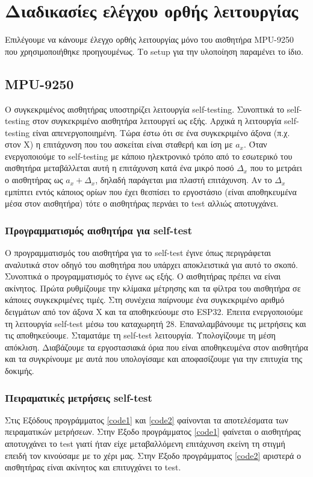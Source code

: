 \documentclass{article}
\begin{document}
\section{Διαδικασίες ελέγχου ορθής λειτουργίας}
Επιλέγουμε να κάνουμε έλεγχο ορθής λειτουργίας μόνο του αισθητήρα ΜPU-9250 που χρησιμοποιήθηκε προηγουμένως. Το setup για την υλοποίηση παραμένει το ίδιο.

\subsection{MPU-9250}
Ο συγκεκριμένος αισθητήρας υποστηρίζει λειτουργία self-testing. Συνοπτικά το self-testing στον συγκεκριμένο αισθητήρα λειτουργεί ως εξής. Αρχικά η λειτουργία self-testing είναι απενεργοποιημένη. Τώρα έστω ότι σε ένα συγκεκριμένο άξονα (π.χ. στον Χ) η επιτάχυνση που του ασκείται είναι σταθερή και ίση με $a_x$. Όταν ενεργοποιούμε το self-testing με κάποιο ηλεκτρονικό τρόπο από το εσωτερικό του αισθητήρα μεταβάλλεται αυτή η επιτάχυνση κατά ένα μικρό ποσό $\Delta_x$ που το μετράει ο αισθητήρας ως $a_x + \Delta_x$, δηλαδή παράγεται μια πλαστή επιτάχυνση. Αν το $\Delta_x$ εμπίπτει εντός κάποιος ορίων που έχει θεσπίσει το εργοστάσιο (είναι αποθηκευμένα μέσα στον αισθητήρα) τότε ο αισθητήρας περνάει το test αλλιώς αποτυγχάνει.

\subsubsection{Προγραμματισμός αισθητήρα για self-test}
O προγραμματισμός του αισθητήρα για το self-test έγινε όπως περιγράφεται αναλυτικά στον οδηγό \cite{evensense2:20} του αισθητήρα που υπάρχει αποκλειστικά για αυτό το σκοπό. Συνοπτικά ο προγραμματισμός το έγινε ως εξής. Ο αισθητήρας πρέπει να είναι ακίνητος. Πρώτα ρυθμίζουμε την κλίμακα μέτρησης και τα φίλτρα του αισθητήρα σε κάποιες συγκεκριμένες τιμές. Στη συνέχεια παίρνουμε ένα συγκεκριμένο αριθμό δειγμάτων από τον άξονα Χ και τα αποθηκεύουμε στο ESP32. Έπειτα ενεργοποιούμε τη λειτουργία self-test μέσω του καταχωρητή 28. Επαναλαμβάνουμε τις μετρήσεις και τις αποθηκεύουμε. Σταματάμε τη self-test λειτουργία. Υπολογίζουμε τη μέση απόκλιση. Διαβάζουμε τα εργοστασιακά όρια που είναι αποθηκευμένα στον αισθητήρα και τα συγκρίνουμε με αυτά που υπολογίσαμε και αποφασίζουμε για την επιτυχία της δοκιμής.

\subsubsection{Πειραματικές μετρήσεις self-test}
Στις Εξόδους προγράμματος \ref{code1} και \ref{code2} φαίνονται τα αποτελέσματα των πειραματικών μετρήσεων. Στην Έξοδο προγράμματος \ref{code1} φαίνεται ο αισθητήρας αποτυγχάνει το test γιατί ήταν είχε μεταβαλλόμενη επιτάχυνση εκείνη τη στιγμή επειδή τον κινούσαμε με το χέρι μας. Στην Έξοδο προγράμματος \ref{code2} αριστερά ο αισθητήρας είναι ακίνητος και επιτυγχάνει το test.
\end{document}
